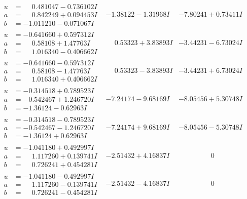 \documentclass[1p]{elsarticle_modified}
\theoremstyle{definition}
\begin{document}
$$\begin{array}{c|c|c}
\begin{aligned}
u &= \phantom{-}0.481047 - 0.736102 I \\
a &= \phantom{-}0.842249 + 0.094453 I \\
b &= -1.011210 - 0.071067 I\end{aligned}
 & -1.38122 - 1.31968 I & -7.80241 + 0.73411 I \\ \hline\begin{aligned}
u &= -0.641660 + 0.597312 I \\
a &= \phantom{-}0.58108 + 1.47763 I \\
b &= \phantom{-}1.016340 - 0.406662 I\end{aligned}
 & \phantom{-}0.53323 + 3.83893 I & -3.44231 - 6.73024 I \\ \hline\begin{aligned}
u &= -0.641660 - 0.597312 I \\
a &= \phantom{-}0.58108 - 1.47763 I \\
b &= \phantom{-}1.016340 + 0.406662 I\end{aligned}
 & \phantom{-}0.53323 - 3.83893 I & -3.44231 + 6.73024 I \\ \hline\begin{aligned}
u &= -0.314518 + 0.789523 I \\
a &= -0.542467 + 1.246720 I \\
b &= -1.36124 - 0.62963 I\end{aligned}
 & -7.24174 - 9.68169 I & -8.05456 + 5.30748 I \\ \hline\begin{aligned}
u &= -0.314518 - 0.789523 I \\
a &= -0.542467 - 1.246720 I \\
b &= -1.36124 + 0.62963 I\end{aligned}
 & -7.24174 + 9.68169 I & -8.05456 - 5.30748 I \\ \hline\begin{aligned}
u &= -1.041180 + 0.492997 I \\
a &= \phantom{-}1.117260 + 0.139741 I \\
b &= \phantom{-}0.726241 + 0.454281 I\end{aligned}
 & -2.51432 + 4.16837 I & \phantom{-0.000000 } 0 \\ \hline\begin{aligned}
u &= -1.041180 - 0.492997 I \\
a &= \phantom{-}1.117260 - 0.139741 I \\
b &= \phantom{-}0.726241 - 0.454281 I\end{aligned}
 & -2.51432 - 4.16837 I & \phantom{-0.000000 } 0 \\ \hline\begin{aligned}

\end{aligned}
\end{array}$$
\end{document}
